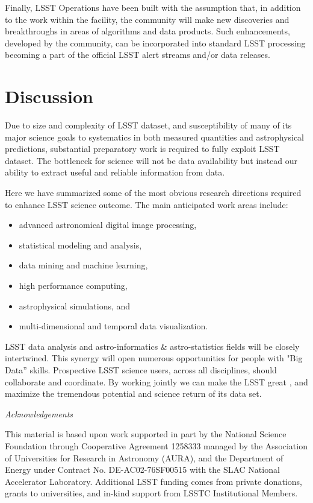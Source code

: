 \documentclass{iau}
\begin{document}
Finally, LSST Operations have been built with the assumption that, in
addition to the work within the facility, the community will make new
discoveries and breakthroughs in areas of algorithms and data products.
Such enhancements, developed by the community, can be incorporated into
standard LSST processing becoming a part of the official LSST alert
streams and/or data releases.

\section{Discussion}

Due to size and complexity of LSST dataset, and susceptibility of many
of its major science goals to systematics in both measured quantities
and astrophysical predictions, substantial preparatory work is
required to fully exploit LSST dataset. The bottleneck for science
will not be data availability but instead our ability to extract
useful and reliable information from data.

Here we have summarized some of the most obvious research directions
required to enhance LSST science outcome. The main anticipated work
areas include:
\begin{itemize}
\item advanced astronomical digital image processing,
\item statistical modeling and analysis,
\item data mining and machine learning,
\item high performance computing,
\item astrophysical simulations, and
\item multi-dimensional and temporal data visualization.  
\end{itemize}

LSST data analysis and astro-informatics \& astro-statistics fields will be closely
intertwined. This synergy will open numerous opportunities for people with "Big Data” skills.
Prospective LSST science users, across all disciplines, should collaborate and
coordinate. By working jointly we can make the LSST great%
, and maximize the tremendous potential and science return of its data set.


\vskip 0.2in 
{\it Acknowledgements}  

This material is based upon work supported in part by the National Science Foundation through
Cooperative Agreement 1258333 managed by the Association of Universities for Research in Astronomy
(AURA), and the Department of Energy under Contract No. DE-AC02-76SF00515 with the SLAC National
Accelerator Laboratory. Additional LSST funding comes from private donations, grants to universities,
and in-kind support from LSSTC Institutional Members.
\end{document}
